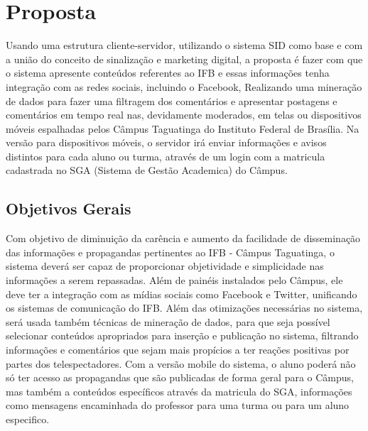 \documentclass[
	12pt,				%
	openright,			%
	oneside,			%
	a4paper,			%
	english,			%
	french,				%
	spanish,			%
	brazil,				%
	]{abntex2}
\begin{document}
\section*{Proposta}
	Usando uma estrutura cliente-servidor, utilizando o sistema SID como base e com a união do conceito de sinalização e marketing digital, a proposta é fazer com que o sistema apresente conteúdos referentes ao IFB e essas informações tenha integração com as redes sociais, incluindo o Facebook, Realizando uma mineração de dados para fazer uma filtragem dos comentários e apresentar postagens e comentários em tempo real nas, devidamente moderados, em telas ou dispositivos móveis espalhadas pelos Câmpus Taguatinga do Instituto Federal de Brasília. Na versão para dispositivos móveis, o servidor irá enviar informações e avisos distintos para cada aluno ou turma, através de um login com a matricula cadastrada no SGA (Sistema de Gestão Academica) do Câmpus.
	
\subsection*{Objetivos Gerais}
	Com objetivo de diminuição da carência e aumento da facilidade de disseminação das informações e propagandas pertinentes ao IFB - Câmpus Taguatinga, o sistema deverá ser capaz de proporcionar objetividade e simplicidade nas informações a serem repassadas. Além de painéis instalados pelo Câmpus, ele deve ter a integração com as mídias sociais como Facebook e Twitter, unificando os sistemas de comunicação do IFB. Além das otimizações necessárias no sistema, será usada também técnicas de mineração de dados, para que seja possível selecionar conteúdos apropriados para inserção e publicação no sistema, filtrando informações e comentários que sejam mais propícios a ter reações positivas por partes dos telespectadores. Com a versão mobile do sistema, o aluno poderá não só ter acesso as propagandas que são publicadas de forma geral para o Câmpus, mas também a conteúdos específicos através da matricula do SGA, informações como mensagens encaminhada do professor para uma turma ou para um aluno especifico.
\end{document}
